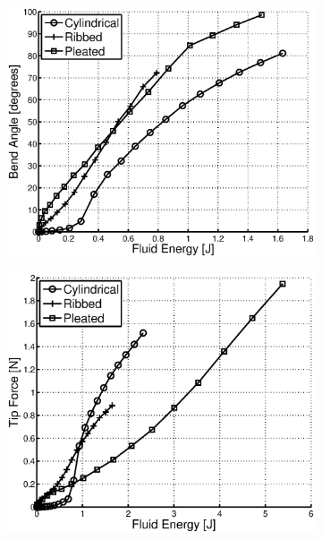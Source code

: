 \begin{figure}[htb]
\begin{subfigure}[b]{0.95\columnwidth}
            \caption{}
            \label{fig:Characterization_CurvatureVsVolume}
        \end{subfigure} \\
        \begin{subfigure}[b]{0.95\columnwidth}
            \centering
            \includegraphics[width=0.95\columnwidth]{figures/actuators/morphologiescharacterization/BendAngleVsEnergy.eps}
            \caption{}
            \label{fig:Characterization_CurvatureVsEnergy}
        \end{subfigure}
        \begin{subfigure}[b]{0.95\columnwidth}
            \centering
            \includegraphics[width=0.95\columnwidth]{figures/actuators/morphologiescharacterization/ForceVsEnergy.eps}

\end{subfigure}
\end{figure}
